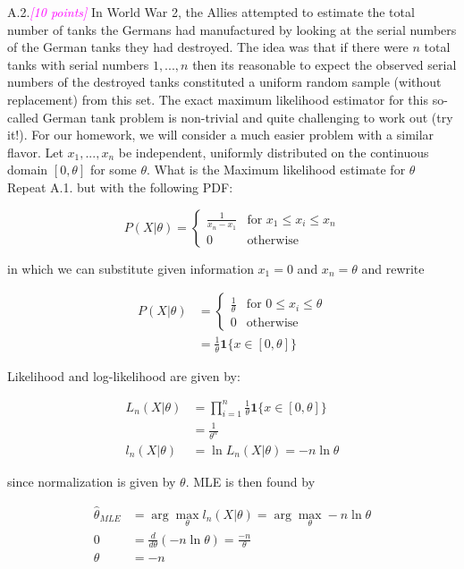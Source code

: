 \documentclass{article}
\newcommand{\argmax}{\arg\!\max}
\newcommand{\1}{\mathbf{1}}
\newcommand{\points}[1]{\small\textcolor{magenta}{\emph{[#1 points]}} \normalsize}
\begin{document}
\newpage
A.2.\points{10} In  World  War  2,  the  Allies  attempted  to  estimate  the  total  number  of  tanks  the  Germans had manufactured by looking at the serial numbers of the German tanks they had destroyed.  The idea was that if there were $n$ total tanks with serial numbers ${1,...,n}$ then its reasonable to expect the observed serial numbers of the destroyed tanks constituted a uniform random sample (without replacement) from this set. The exact maximum likelihood estimator for this so-called German tank problem is non-trivial and quite challenging to work out (try it!). For our homework, we will consider a much easier problem with a similar flavor. Let $x_1,...,x_n$ be independent, uniformly distributed on the continuous domain $[0,\theta]$ for some $\theta$.  What is the Maximum likelihood estimate for $\theta$ \\
Repeat A.1. but with the following PDF: 

$$ P(X|\theta) = \begin{cases} 
\frac{1}{x_n-x_1} &\mbox{for } x_1 \leq x_i \leq x_n \\ 
0 &\mbox{otherwise}
\end{cases}$$

in which we can substitute given information $x_1=0$ and $x_n=\theta$ and rewrite

\begin{align*}
P(X|\theta) &= \begin{cases} 
        \frac{1}{\theta} &\mbox{for } 0 \leq x_i \leq \theta \\ 
        0 &\mbox{otherwise}
    \end{cases}\\
& = \frac{1}{\theta} \1 \{ x \in [0,\theta] \}
\end{align*}

Likelihood and log-likelihood are given by:

\begin{align*}
L_n(X|\theta) &= \prod_{i=1}^n\frac{1}{\theta} \1 \{ x \in [0,\theta] \} \\
&=\frac{1}{\theta^n} \\
l_n(X|\theta) &= \ln L_n(X|\theta) = -n\ln\theta
\end{align*}

since normalization is given by $\theta$. MLE is then found by

\begin{align*}
\widehat\theta_{MLE} &= \argmax_\theta l_n(X|\theta) = \argmax_\theta -n\ln\theta \\
0 &= \frac{d}{d\theta}(-n\ln\theta) = \frac{-n}{\theta} \\
\theta &= -n
\end{align*}
\end{document}
